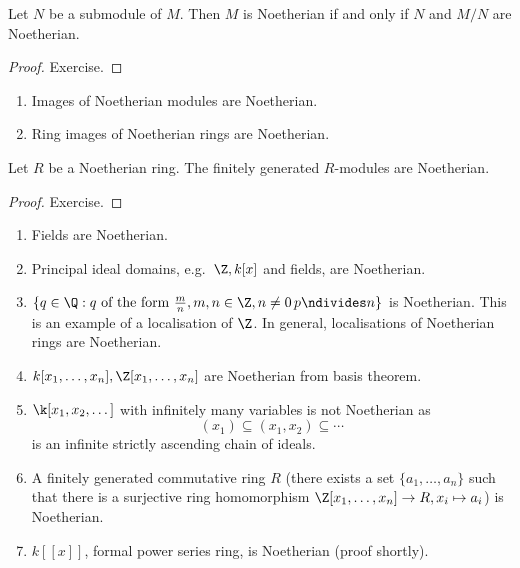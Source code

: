 \documentclass[a4paper]{article}
\begin{document}
\begin{lemma}
  Let \(N\) be a submodule of \(M\). Then \(M\) is Noetherian if and only if \(N\) and \(M/N\) are Noetherian.
\end{lemma}

\begin{proof}
  Exercise.
\end{proof}

\begin{remark}\leavevmode
  \begin{enumerate}
  \item Images of Noetherian modules are Noetherian.
  \item Ring images of Noetherian rings are Noetherian.
  \end{enumerate}
\end{remark}

\begin{lemma}
  Let \(R\) be a Noetherian ring. The finitely generated \(R\)-modules are Noetherian.
\end{lemma}

\begin{proof}
  Exercise.
\end{proof}

\begin{eg}\leavevmode
  \begin{enumerate}
  \item Fields are Noetherian.
  \item Principal ideal domains, e.g.\ \(\Z, k[x]\) and fields, are Noetherian.
  \item \(\{q \in \Q: q \text{ of the form } \frac{m}{n}, m, n \in \Z, n \neq 0\, p \ndivides n\}\) is Noetherian. This is an example of a localisation of \(\Z\). In general, localisations of Noetherian rings are Noetherian.
  \item \(k[x_1, \dots, x_n], \Z[x_1, \dots, x_n]\) are Noetherian from basis theorem.
  \item \(\k[x_1, x_2, \dots]\) with infinitely many variables is not Noetherian as
    \[
      (x_1) \subseteq (x_1, x_2) \subseteq \cdots
    \]
    is an infinite strictly ascending chain of ideals.
  \item A finitely generated commutative ring \(R\) (there exists a set \(\{a_1, \dots, a_n\}\) such that there is a surjective ring homomorphism \(\Z[x_1, \dots, x_n] \to R, x_i \mapsto a_i\)) is Noetherian.
  \item \(k[[x]]\), formal power series ring, is Noetherian (proof shortly).
  \end{enumerate}
\end{eg}
\end{document}
